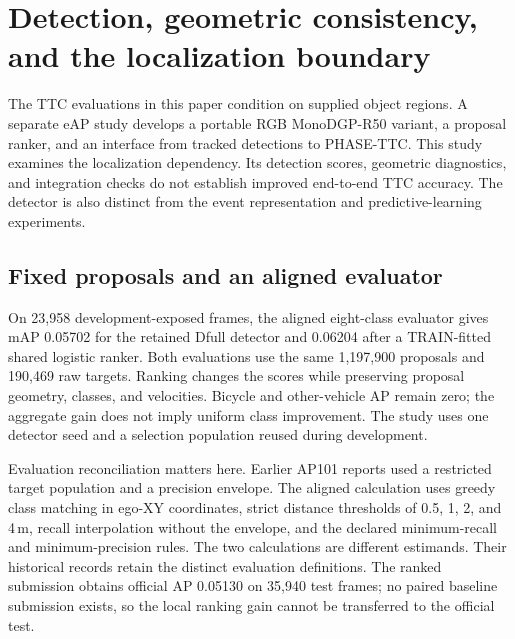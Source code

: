 \section{Detection, geometric consistency, and the localization boundary}
\label{app:detection-followup}

The TTC evaluations in this paper condition on supplied object regions. A separate eAP study develops a portable RGB MonoDGP-R50 variant, a proposal ranker, and an interface from tracked detections to PHASE-TTC. This study examines the localization dependency. Its detection scores, geometric diagnostics, and integration checks do not establish improved end-to-end TTC accuracy. The detector is also distinct from the event representation and predictive-learning experiments. 

\subsection{Fixed proposals and an aligned evaluator}
On 23,958 development-exposed frames, the aligned eight-class evaluator gives mAP 0.05702 for the retained Dfull detector and 0.06204 after a TRAIN-fitted shared logistic ranker. Both evaluations use the same 1,197,900 proposals and 190,469 raw targets. Ranking changes the scores while preserving proposal geometry, classes, and velocities. Bicycle and other-vehicle AP remain zero; the aggregate gain does not imply uniform class improvement. The study uses one detector seed and a selection population reused during development. 

Evaluation reconciliation matters here. Earlier AP101 reports used a restricted target population and a precision envelope. The aligned calculation uses greedy class matching in ego-XY coordinates, strict distance thresholds of 0.5, 1, 2, and 4\,m, recall interpolation without the envelope, and the declared minimum-recall and minimum-precision rules. The two calculations are different estimands. Their historical records retain the distinct evaluation definitions. The ranked submission obtains official AP 0.05130 on 35,940 test frames; no paired baseline submission exists, so the local ranking gain cannot be transferred to the official test. 

